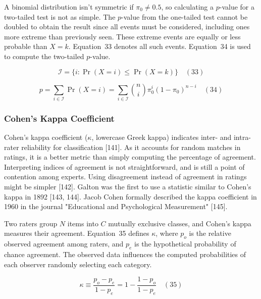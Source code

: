 \documentclass[preprint,12pt]{elsarticle}
\begin{document}
A binomial distribution isn't symmetric if $\pi_{0}\neq 0.5$, so calculating a $p$-value for a two-tailed test is not as simple. The $p$-value from the one-tailed test cannot be doubled to obtain the result since all events must be considered, including ones more extreme than previously seen. These extreme events are equally or less probable than $X=k$. Equation~33 denotes all such events. Equation~34 is used to compute the two-tailed $p$-value.

\begin{equation}
	{\mathcal{I}}=\{i\colon \Pr(X=i)\leq \Pr(X=k)\}
	\quad\left(33\right)
\end{equation}

\begin{equation}
	p=\sum_{i\in {\mathcal{I}}}\Pr(X=i)=\sum_{i\in {\mathcal{I}}}{\binom{n}{i}}\pi_{0}^{i}(1-\pi_{0})^{n-i}
	\quad\left(34\right)
\end{equation}

\subsubsection{Cohen's Kappa Coefficient}

Cohen's kappa coefficient ($\kappa$, lowercase Greek kappa) indicates inter- and intra-rater reliability for classification [141]. As it accounts for random matches in ratings, it is a better metric than simply computing the percentage of agreement. Interpreting indices of agreement is not straightforward, and is still a point of contention among experts. Using disagreement instead of agreement in ratings might be simpler [142]. Galton was the first to use a statistic similar to Cohen's kappa in 1892 [143, 144]. Jacob Cohen formally described the kappa coefficient in 1960 in the journal "Educational and Psychological Measurement" [145].

Two raters group $N$ items into $C$ mutually exclusive classes, and Cohen's kappa measures their agreement. Equation~35 defines $\kappa$, where $p_{o}$ is the relative observed agreement among raters, and $p_{e}$ is the hypothetical probability of chance agreement. The observed data influences the computed probabilities of each observer randomly selecting each category.

\begin{equation}
	\kappa \equiv {\frac {p_{o}-p_{e}}{1-p_{e}}}=1-{\frac {1-p_{o}}{1-p_{e}}}
	\quad\left(35\right)
\end{equation}
\end{document}
